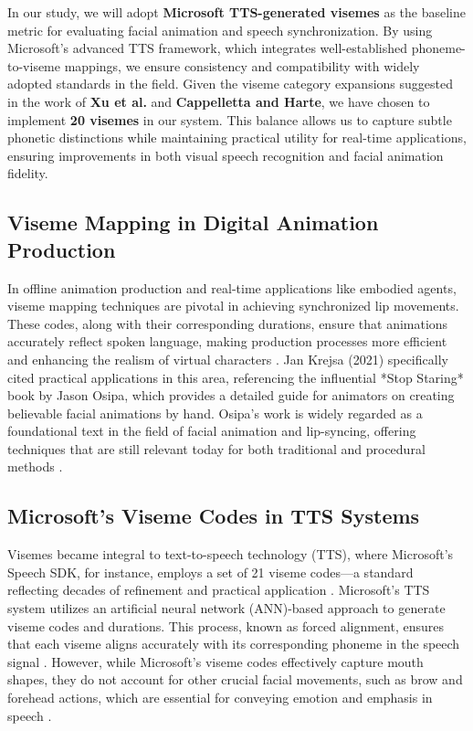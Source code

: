 \documentclass[12pt]{article}
\begin{document}
In our study, we will adopt \textbf{Microsoft TTS-generated visemes} as the baseline metric for evaluating facial animation and speech synchronization. By using Microsoft’s advanced TTS framework, which integrates well-established phoneme-to-viseme mappings, we ensure consistency and compatibility with widely adopted standards in the field. Given the viseme category expansions suggested in the work of \textbf{Xu et al.} and \textbf{Cappelletta and Harte}, we have chosen to implement \textbf{20 visemes} in our system. This balance allows us to capture subtle phonetic distinctions while maintaining practical utility for real-time applications, ensuring improvements in both visual speech recognition and facial animation fidelity.
\subsection{Viseme Mapping in Digital Animation Production}
\label{sec:useinprod}
In offline animation production and real-time applications like embodied agents, viseme mapping techniques are pivotal in achieving synchronized lip movements. These codes, along with their corresponding durations, ensure that animations accurately reflect spoken language, making production processes more efficient and enhancing the realism of virtual characters \cite{Osipa2010StopRight}. Jan Krejsa (2021) specifically cited practical applications in this area, referencing the influential *Stop Staring* book by Jason Osipa, which provides a detailed guide for animators on creating believable facial animations by hand. Osipa's work is widely regarded as a foundational text in the field of facial animation and lip-syncing, offering techniques that are still relevant today for both traditional and procedural methods \cite{Krejsa2019, Krejsa2021}.

\subsection{Microsoft's Viseme Codes in TTS Systems}
\label{sec:mstts}
Visemes became integral to text-to-speech technology (TTS), where Microsoft’s Speech SDK, for instance, employs a set of 21 viseme codes—a standard reflecting decades of refinement and practical application \cite{GetLearn}. Microsoft's TTS system utilizes an artificial neural network (ANN)-based approach to generate viseme codes and durations. This process, known as forced alignment, ensures that each viseme aligns accurately with its corresponding phoneme in the speech signal \cite{Xu213}. However, while Microsoft’s viseme codes effectively capture mouth shapes, they do not account for other crucial facial movements, such as brow and forehead actions, which are essential for conveying emotion and emphasis in speech \cite{Massaro1998PerceivingPrinciple, Massaro2000ReviewPrinciple}.
\end{document}
